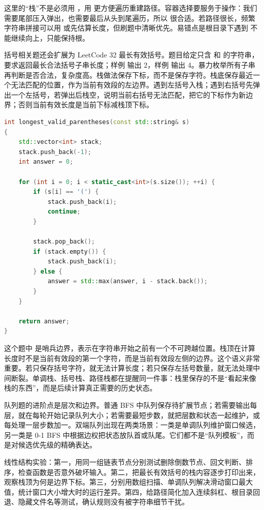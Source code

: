 这里的“栈”不是必须用 ，用  更方便遍历重建路径。容器选择要服务于操作：我们需要尾部压入弹出，也需要最后从头到尾遍历，所以  很合适。若路径很长，频繁字符串拼接可以用  或先估算长度，但刷题中清晰优先。易错点是根目录下遇到  不能继续向上，只能保持根。

括号相关题还会扩展为 LeetCode 32 最长有效括号。题目给定只含 \code{(} 和 \code{)} 的字符串，要求返回最长合法括号子串长度；样例  输出 2，样例  输出 4。暴力枚举所有子串再判断是否合法，复杂度高。栈做法保存下标，而不是保存字符。栈底保存最近一个无法匹配的位置，作为当前有效段的左边界。遇到左括号入栈；遇到右括号先弹出一个左括号，若弹出后栈空，说明当前右括号无法匹配，把它的下标作为新边界；否则当前有效长度是当前下标减栈顶下标。

\begin{lstlisting}[language=C++,caption={LeetCode 32 最长有效括号：栈保存边界下标}]
int longest_valid_parentheses(const std::string& s)
{
    std::vector<int> stack;
    stack.push_back(-1);
    int answer = 0;

    for (int i = 0; i < static_cast<int>(s.size()); ++i) {
        if (s[i] == '(') {
            stack.push_back(i);
            continue;
        }

        stack.pop_back();
        if (stack.empty()) {
            stack.push_back(i);
        } else {
            answer = std::max(answer, i - stack.back());
        }
    }

    return answer;
}
\end{lstlisting}

这个题中  是哨兵边界，表示在字符串开始之前有一个不可跨越位置。栈顶在计算长度时不是当前有效段的第一个字符，而是当前有效段左侧的边界。这个语义非常重要。若只保存括号字符，就无法计算长度；若只保存左括号数量，就无法处理中间断裂。单调栈、括号栈、路径栈都在提醒同一件事：栈里保存的不是“看起来像栈的东西”，而是后续计算真正需要的历史状态。

队列题的进阶点是层次和边界。普通 BFS 中队列保存待扩展节点；若需要输出每层，就在每轮开始记录队列大小；若需要最短步数，就把层数和状态一起维护，或每处理一层步数加一。双端队列出现在两类场景：一类是单调队列维护窗口候选，另一类是 0-1 BFS 中根据边权把状态放队首或队尾。它们都不是“队列模板”，而是对候选优先级的精确表达。

\begin{labbox}
线性结构实验：第一，用同一组链表节点分别测试删除倒数节点、回文判断、排序，检查函数是否意外破坏输入。第二，把最长有效括号的栈内容逐步打印出来，观察栈顶为何是边界下标。第三，分别用数组扫描、单调队列解决滑动窗口最大值，统计窗口大小增大时的运行差异。第四，给路径简化加入连续斜杠、根目录回退、隐藏文件名等测试，确认规则没有被字符串细节干扰。
\end{labbox}

